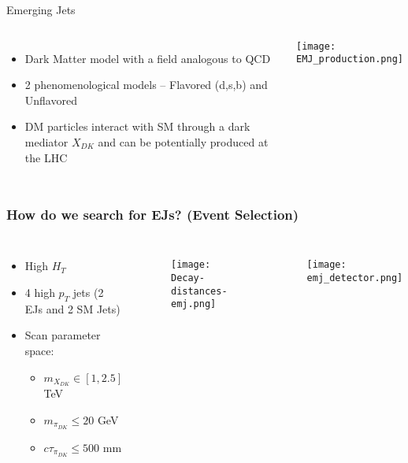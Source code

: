 \documentclass[aspectratio=1610]{beamer}
\begin{document}
\begin{frame}{Emerging Jets}
	\begin{columns}
		\begin{itemize}
			\item Dark Matter model with a field analogous to QCD
			\item 2 phenomenological models -- Flavored (d,s,b) and Unflavored
			\item DM particles interact with SM through a dark mediator $X_{DK}$ and can be potentially produced at the LHC
		\end{itemize}
		\texttt{[image: EMJ\_production.png]}
	\end{columns}
\end{frame}

\begin{frame}
	\frametitle{How do we search for EJs? (Event Selection)}
	\begin{columns}
		\column{.6\linewidth}
		\begin{itemize}
			\item High $H_T$
			\item 4 high $p_T$ jets (2 EJs and 2 SM Jets)
			\item Scan parameter space:
			      \begin{itemize}
				      \item $m_{X_{DK}} \in [1,2.5] $ TeV
				      \item $m_{\pi_{DK}} \leq 20$ GeV
				      \item $c\tau_{\pi_{DK}} \leq 500$ mm
			      \end{itemize}
		\end{itemize}

		\begin{figure}
			\centering
			\texttt{[image: Decay-distances-emj.png]}
		\end{figure}

		\column{.4\linewidth}

		\begin{figure}
			\centering
			\texttt{[image: emj\_detector.png]}
		\end{figure}


	\end{columns}

\end{frame}
\end{document}
